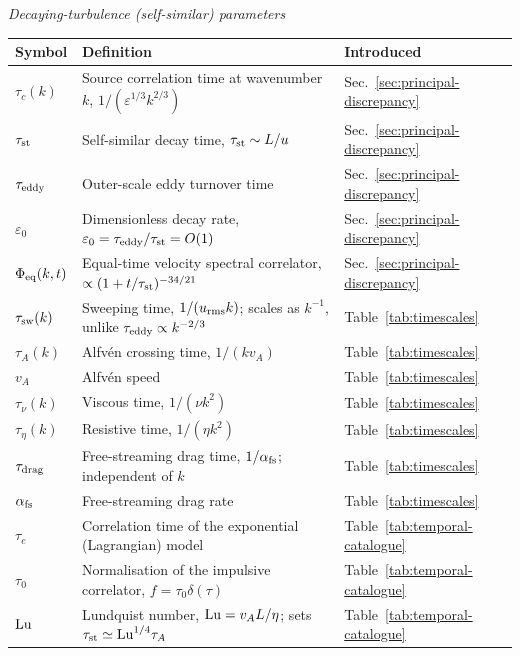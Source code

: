 \documentclass[10pt,prd,aps,nobibnotes,superscriptaddress,preprintnumbers,notitlepage]{revtex4-1}
\begin{document}
\medskip\noindent \emph{Decaying-turbulence (self-similar) parameters}\par\nobreak\smallskip
\noindent\begin{tabular}{@{}p{} p{} p{}@{}}
\hline\hline
Symbol & Definition & Introduced \\
\hline
$\tau_c(k)$           & Source correlation time at wavenumber $k$, $1/(\varepsilon^{1/3}k^{2/3})$ & Sec.~\ref{sec:principal-discrepancy}\\
$\tau_{\rm st}$       & Self-similar decay time, $\tau_{\rm st}\sim L/u$ & Sec.~\ref{sec:principal-discrepancy}\\
$\tau_{\rm eddy}$     & Outer-scale eddy turnover time & Sec.~\ref{sec:principal-discrepancy}\\
$\varepsilon_0$       & Dimensionless decay rate, $\varepsilon_0=\tau_{\rm eddy}/\tau_{\rm st}=O(1)$ & Sec.~\ref{sec:principal-discrepancy}\\
$\Phi_{\rm eq}(k,t)$  & Equal-time velocity spectral correlator, $\propto(1+t/\tau_{\rm st})^{-34/21}$ & Sec.~\ref{sec:principal-discrepancy}\\
$\tau_{\rm sw}(k)$    & Sweeping time, $1/(u_{\rm rms}k)$; scales as $k^{-1}$, unlike $\tau_{\rm eddy}\propto k^{-2/3}$ & Table~\ref{tab:timescales}\\
$\tau_A(k)$           & Alfv\'en crossing time, $1/(k v_A)$ & Table~\ref{tab:timescales}\\
$v_A$                 & Alfv\'en speed & Table~\ref{tab:timescales}\\
$\tau_\nu(k)$         & Viscous time, $1/(\nu k^{2})$ & Table~\ref{tab:timescales}\\
$\tau_\eta(k)$        & Resistive time, $1/(\eta k^{2})$ & Table~\ref{tab:timescales}\\
$\tau_{\rm drag}$     & Free-streaming drag time, $1/\alpha_{\rm fs}$; independent of $k$ & Table~\ref{tab:timescales}\\
$\alpha_{\rm fs}$     & Free-streaming drag rate & Table~\ref{tab:timescales}\\
$\tau_e$              & Correlation time of the exponential (Lagrangian) model & Table~\ref{tab:temporal-catalogue}\\
$\tau_0$              & Normalisation of the impulsive correlator, $f=\tau_0\delta(\tau)$ & Table~\ref{tab:temporal-catalogue}\\
${\rm Lu}$            & Lundquist number, ${\rm Lu}=v_AL/\eta$; sets $\tau_{\rm st}\simeq{\rm Lu}^{1/4}\tau_A$ \cite{Brandenburg:2024tyi} & Table~\ref{tab:temporal-catalogue}\\

\end{tabular}
\end{document}
